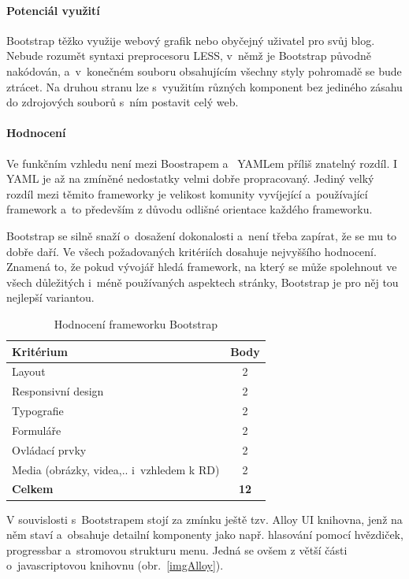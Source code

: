 \documentclass[thesis=B,czech]{FITthesis}[2012/06/26]
\begin{document}
\paragraph{Potenciál využití}

 Bootstrap těžko využije webový grafik nebo obyčejný uživatel pro svůj blog. Nebude rozumět syntaxi preprocesoru LESS, v~němž je Bootstrap původně nakódován, a~v~konečném souboru obsahujícím všechny styly pohromadě se bude ztrácet. Na druhou stranu lze s~využitím různých komponent bez jediného zásahu do zdrojových souborů s~ním postavit celý web. 

\paragraph{Hodnocení}

Ve funkčním vzhledu není mezi Boostrapem a~ YAMLem příliš znatelný rozdíl. I YAML je až na zmíněné nedostatky velmi dobře propracovaný. Jediný velký rozdíl mezi těmito frameworky je velikost komunity vyvíjející a~používající framework a~to především z důvodu odlišné orientace každého frameworku.

Bootstrap se silně snaží o~dosažení dokonalosti a~není třeba zapírat, že se mu to dobře daří. Ve všech požadovaných kritériích dosahuje nejvyššího hodnocení. Znamená to, že pokud vývojář hledá framework, na který se může spolehnout ve všech důležitých i~méně používaných aspektech stránky, Bootstrap je pro něj tou nejlepší variantou.



\begin{table}[h]\centering
 	\caption[Hodnocení Bootstrapu]{Hodnocení frameworku Bootstrap}\label{tab:bootstrap}
 	\begin{tabular}{|l|c|}\hline
 	\textbf{Kritérium} & \textbf{Body}\tabularnewline
 	\hline\hline
		Layout & 2\tabularnewline
		\hline 
		 Responsivní design & 2\tabularnewline
		\hline 
		Typografie & 2\tabularnewline
		\hline 
		Formuláře & 2\tabularnewline
		\hline 
		Ovládací prvky & 2\tabularnewline
		\hline 
		Media  (obrázky, videa,.. i~vzhledem k RD) & 2\tabularnewline
		\hline 
		\textbf{Celkem} & \textbf{12}\tabularnewline
		\hline 
 	\end{tabular}
\end{table} 

V souvislosti s~Bootstrapem stojí za zmínku ještě tzv. Alloy UI knihovna, jenž na něm staví a~obsahuje detailní komponenty jako např. hlasování pomocí hvězdiček, progressbar a~stromovou strukturu menu. Jedná se ovšem z větší části o~javascriptovou knihovnu (obr.~\ref{imgAlloy}).
\end{document}
